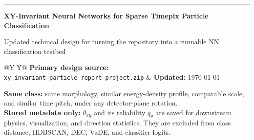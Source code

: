 \documentclass[11pt,a4paper]{article}
\newcommand{\code}[1]{\texttt{#1}}
\newcommand{\thetaxy}{\theta_{xy}}
\newcommand{\phit}{\phi_t}
\begin{document}
{\color{Accent}\rule{\textwidth}{1.5pt}}
\vspace{0.6em}

{\LARGE\bfseries XY-Invariant Neural Networks for Sparse Timepix Particle Classification\par}
\vspace{0.35em}
{\large Updated technical design for turning the repository into a runnable NN classification testbed\par}

\vspace{0.6em}
\begin{tabularx}{\textwidth}{@{}Y Y@{}}
\textbf{Primary design source:} \code{xy\_invariant\_particle\_report\_project.zip} &
\textbf{Updated:} \today \\
\end{tabularx}
\vspace{0.8em}

\begin{abstract}
This report replaces the earlier report-first recommendation with an implementation-oriented design contract. Candidate particles should be represented as variable-size point sets
\[
P=\{(x_i,y_i,t_i,e_i)\}_{i=1}^{M},
\]
where $x,y$ are detector-plane coordinates, $t$ is a time-like coordinate derived from ToA/FToA or frame metadata, and $e$ is an energy-like feature such as $\log(1+\mathrm{ToT})$ until calibrated energy is available. The central correction is selective invariance: detector-plane rotation $\thetaxy$ must be computed and stored, but it must not define a class. A horizontal, vertical, or diagonal copy of the same track-like morphology should map to the same class embedding. Time pitch $\phit$, shape, energy density, scale, and total energy remain classification-relevant.

The recommended baseline is a deterministic geometry front-end plus a compact canonical PointNet/DeepSets model called \textbf{XYInvariantParticleNet}. DBSCAN remains useful as an interpretable candidate generator, but clustering/classification after the encoder must operate only on $z_{class}$, never on a saved descriptor that includes $\thetaxy$.
\end{abstract}

\begin{tcolorbox}[colback=AccentLight,colframe=Accent,title=\textbf{Main Design Contract}]
\textbf{Same class:} same morphology, similar energy-density profile, comparable scale, and similar time pitch, under any detector-plane rotation.\\
\textbf{Stored metadata only:} $\thetaxy$ and its reliability $q_\theta$ are saved for downstream physics, visualization, and direction statistics. They are excluded from class distance, HDBSCAN, DEC, VaDE, and classifier logits.
\end{tcolorbox}
\end{document}
